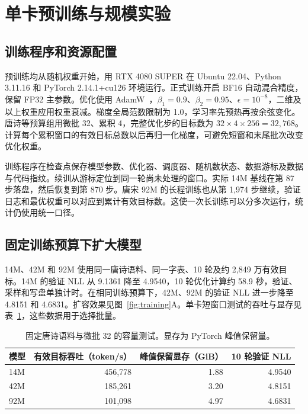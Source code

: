 \section{单卡预训练与规模实验}
\label{sec:pretrain}

\subsection{训练程序和资源配置}

预训练均从随机权重开始，用 RTX 4080 SUPER 在 Ubuntu 22.04、Python 3.11.16 和 PyTorch 2.14.1+cu126 环境运行。正式训练开启 BF16 自动混合精度，保留 FP32 主参数。优化使用 AdamW~\cite{loshchilov2019decoupled}，$\beta_1=0.9$、$\beta_2=0.95$、$\epsilon=10^{-8}$，二维及以上权重应用权重衰减。梯度全局范数限制为 1.0，学习率先预热再按余弦变化。唐诗等预算组用微批 32、累积 4，完整优化步的目标数为 $32\times4\times256=32{,}768$。计算每个累积窗口的有效目标总数以后再归一化梯度，可避免短窗和末尾批次改变优化权重。

训练程序在检查点保存模型参数、优化器、调度器、随机数状态、数据游标及数据与代码指纹。续训从游标定位到同一轮尚未处理的窗口。实际 14M 基线在第 87 步落盘，然后恢复到第 870 步。唐宋 92M 的长程训练也从第 1,974 步继续，验证日志和最优权重可以对应到累计有效目标数。这使一次长训练可以分多次运行，统计仍使用统一口径。

\subsection{固定训练预算下扩大模型}

14M、42M 和 92M 使用同一唐诗语料、同一字表、10 轮及约 2,849 万有效目标。14M 的验证 NLL 从 9.1361 降至 4.9540，10 轮优化计算约 58.9 秒，验证、采样和写盘单独计时。在相同训练预算下，42M、92M 的验证 NLL 进一步降至 4.8151 和 4.6831。扩容效果见图~\ref{fig:training}A。单卡短窗口测试的吞吐与显存见表~\ref{tab:capacity}，这些数据用于选择批量。

\begin{table}[!htbp]
\centering
\caption{固定唐诗语料与微批 32 的容量测试。显存为 PyTorch 峰值保留量。}
\label{tab:capacity}
\begin{tabular}{@{}lrrr@{}}
\toprule
模型 & 有效目标吞吐（token/s） & 峰值保留显存（GiB） & 10 轮验证 NLL\\
\midrule
14M & 456,778 & 1.88 & 4.9540\\
42M & 185,261 & 3.20 & 4.8151\\
92M & 101,098 & 4.97 & 4.6831\\
\bottomrule
\end{tabular}
\end{table}

